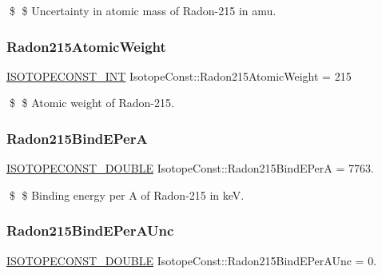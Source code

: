 \$ \$ Uncertainty in atomic mass of Radon-\/215 in amu. \mbox{\label{group___isotope_const-_radon-_rn215_ga97c0f03697bee242b0303add1c497b19}} 
\subsubsection{\texorpdfstring{Radon215\+Atomic\+Weight}{Radon215AtomicWeight}}
{\footnotesize\ttfamily \mbox{\hyperlink{group___isotope_const-_macros_ga5f18360b3e99483a35c32d789e62621c}{I\+S\+O\+T\+O\+P\+E\+C\+O\+N\+S\+T\+\_\+\+I\+NT}} Isotope\+Const\+::\+Radon215\+Atomic\+Weight = 215}

\$ \$ Atomic weight of Radon-\/215. \mbox{\label{group___isotope_const-_radon-_rn215_ga5ba897dd0a2db12a0e55097b6d4ed0a4}} 
\subsubsection{\texorpdfstring{Radon215\+Bind\+E\+PerA}{Radon215BindEPerA}}
{\footnotesize\ttfamily \mbox{\hyperlink{group___isotope_const-_macros_ga8f45a7272ce02c0b4c65c44636ed719a}{I\+S\+O\+T\+O\+P\+E\+C\+O\+N\+S\+T\+\_\+\+D\+O\+U\+B\+LE}} Isotope\+Const\+::\+Radon215\+Bind\+E\+PerA = 7763.}

\$ \$ Binding energy per A of Radon-\/215 in keV. \mbox{\label{group___isotope_const-_radon-_rn215_ga9ac7589c46f5c2e20d1c39ce39345bae}} 
\subsubsection{\texorpdfstring{Radon215\+Bind\+E\+Per\+A\+Unc}{Radon215BindEPerAUnc}}
{\footnotesize\ttfamily \mbox{\hyperlink{group___isotope_const-_macros_ga8f45a7272ce02c0b4c65c44636ed719a}{I\+S\+O\+T\+O\+P\+E\+C\+O\+N\+S\+T\+\_\+\+D\+O\+U\+B\+LE}} Isotope\+Const\+::\+Radon215\+Bind\+E\+Per\+A\+Unc = 0.}

